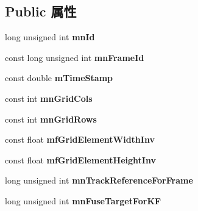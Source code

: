 \subsection*{Public 属性}
\begin{DoxyCompactItemize}
\item 
\hypertarget{classORB__SLAM2_1_1KeyFrame_a1e3d56caca4e4cc372c36a3270d490c7}{long unsigned int {\bfseries mn\-Id}}\label{classORB__SLAM2_1_1KeyFrame_a1e3d56caca4e4cc372c36a3270d490c7}

\item 
\hypertarget{classORB__SLAM2_1_1KeyFrame_a75ad29c06d8c969a341d9f633b43569e}{const long unsigned int {\bfseries mn\-Frame\-Id}}\label{classORB__SLAM2_1_1KeyFrame_a75ad29c06d8c969a341d9f633b43569e}

\item 
\hypertarget{classORB__SLAM2_1_1KeyFrame_ab4fa3d61a524547cfe2be2523d199833}{const double {\bfseries m\-Time\-Stamp}}\label{classORB__SLAM2_1_1KeyFrame_ab4fa3d61a524547cfe2be2523d199833}

\item 
\hypertarget{classORB__SLAM2_1_1KeyFrame_a7fe0d03aabb1643abb8f4eef33fdf95a}{const int {\bfseries mn\-Grid\-Cols}}\label{classORB__SLAM2_1_1KeyFrame_a7fe0d03aabb1643abb8f4eef33fdf95a}

\item 
\hypertarget{classORB__SLAM2_1_1KeyFrame_afb859eb91a2365180b006a185aa36ba6}{const int {\bfseries mn\-Grid\-Rows}}\label{classORB__SLAM2_1_1KeyFrame_afb859eb91a2365180b006a185aa36ba6}

\item 
\hypertarget{classORB__SLAM2_1_1KeyFrame_a7ad664a3275b80e901f3fa290ad7804e}{const float {\bfseries mf\-Grid\-Element\-Width\-Inv}}\label{classORB__SLAM2_1_1KeyFrame_a7ad664a3275b80e901f3fa290ad7804e}

\item 
\hypertarget{classORB__SLAM2_1_1KeyFrame_a89412cd7a6d467c262a7c3a584c81990}{const float {\bfseries mf\-Grid\-Element\-Height\-Inv}}\label{classORB__SLAM2_1_1KeyFrame_a89412cd7a6d467c262a7c3a584c81990}

\item 
\hypertarget{classORB__SLAM2_1_1KeyFrame_a1c775159303dc3435fc05e73f30f2865}{long unsigned int {\bfseries mn\-Track\-Reference\-For\-Frame}}\label{classORB__SLAM2_1_1KeyFrame_a1c775159303dc3435fc05e73f30f2865}

\item 
\hypertarget{classORB__SLAM2_1_1KeyFrame_a2bad332e7057e8f59d630e78c7994129}{long unsigned int {\bfseries mn\-Fuse\-Target\-For\-K\-F}}\label{classORB__SLAM2_1_1KeyFrame_a2bad332e7057e8f59d630e78c7994129}


\end{DoxyCompactItemize}
